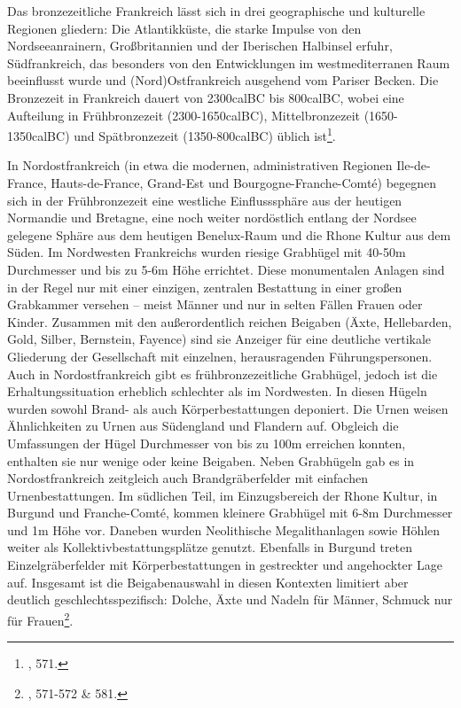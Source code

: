 \documentclass[openany,twoside,twocolumn]{book}
\let\rmarkdownfootnote\footnote%
\def\footnote{\protect\rmarkdownfootnote}
\begin{document}
Das bronzezeitliche Frankreich lässt sich in drei geographische und
kulturelle Regionen gliedern: Die Atlantikküste, die starke Impulse von
den Nordseeanrainern, Großbritannien und der Iberischen Halbinsel
erfuhr, Südfrankreich, das besonders von den Entwicklungen im
westmediterranen Raum beeinflusst wurde und (Nord)Ostfrankreich
ausgehend vom Pariser Becken. Die Bronzezeit in Frankreich dauert von
2300calBC bis 800calBC, wobei eine Aufteilung in Frühbronzezeit
(2300-1650calBC), Mittelbronzezeit (1650-1350calBC) und Spätbronzezeit
(1350-800calBC) üblich ist\footnote{\textcite{mordant_bronze_2013}, 571.}.

In Nordostfrankreich (in etwa die modernen, administrativen Regionen
Ile-de-France, Hauts-de-France, Grand-Est und Bourgogne-Franche-Comté)
begegnen sich in der Frühbronzezeit eine westliche Einflusssphäre aus
der heutigen Normandie und Bretagne, eine noch weiter nordöstlich
entlang der Nordsee gelegene Sphäre aus dem heutigen Benelux-Raum und
die Rhone Kultur aus dem Süden. Im Nordwesten Frankreichs wurden riesige
Grabhügel mit 40-50m Durchmesser und bis zu 5-6m Höhe errichtet. Diese
monumentalen Anlagen sind in der Regel nur mit einer einzigen, zentralen
Bestattung in einer großen Grabkammer versehen -- meist Männer und nur
in selten Fällen Frauen oder Kinder. Zusammen mit den außerordentlich
reichen Beigaben (Äxte, Hellebarden, Gold, Silber, Bernstein, Fayence)
sind sie Anzeiger für eine deutliche vertikale Gliederung der
Gesellschaft mit einzelnen, herausragenden Führungspersonen. Auch in
Nordostfrankreich gibt es frühbronzezeitliche Grabhügel, jedoch ist die
Erhaltungssituation erheblich schlechter als im Nordwesten. In diesen
Hügeln wurden sowohl Brand- als auch Körperbestattungen deponiert. Die
Urnen weisen Ähnlichkeiten zu Urnen aus Südengland und Flandern auf.
Obgleich die Umfassungen der Hügel Durchmesser von bis zu 100m erreichen
konnten, enthalten sie nur wenige oder keine Beigaben. Neben Grabhügeln
gab es in Nordostfrankreich zeitgleich auch Brandgräberfelder mit
einfachen Urnenbestattungen. Im südlichen Teil, im Einzugsbereich der
Rhone Kultur, in Burgund und Franche-Comté, kommen kleinere Grabhügel
mit 6-8m Durchmesser und 1m Höhe vor. Daneben wurden Neolithische
Megalithanlagen sowie Höhlen weiter als Kollektivbestattungsplätze
genutzt. Ebenfalls in Burgund treten Einzelgräberfelder mit
Körperbestattungen in gestreckter und angehockter Lage auf. Insgesamt
ist die Beigabenauswahl in diesen Kontexten limitiert aber deutlich
geschlechtsspezifisch: Dolche, Äxte und Nadeln für Männer, Schmuck nur
für Frauen\footnote{\textcite{mordant_bronze_2013}, 571-572 \& 581.}.
\end{document}
